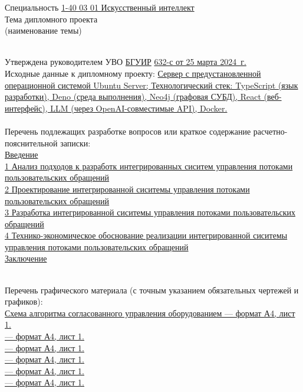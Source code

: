 {\begin{center}
  Специальность \uline{1-40 03 01 Искусственный интеллект}\lineunderscore\\[0.5em]

  Тема дипломного проекта \uline{\topicName}\lineunderscore \\
  {\footnotesize\hspace{15em}(наименование темы)}\\[-0.5em]
  \lineunderscore\\[0.5em]
  \end{center}

  Утверждена руководителем УВО \uline{БГУИР} \textnumero  \uline{632-с от 25 марта 2024~г.}\lineunderscore\\[-0.5em]
  
  Исходные данные к дипломному проекту: \uline{Сервер с предустановленной операционной системой Ubuntu Server; Технологический стек: TypeScript (язык разработки), Deno (среда выполнения), Neo4j (графовая СУБД), React (веб-интерфейс), LLM (через OpenAI-совместимые API), Docker. }\lineunderscore\\[0.5em]
  \lineunderscore\\
  
  Перечень подлежащих разработке вопросов или краткое содержание расчетно-пояснительной записки: 
  \lineunderscore\\
  \uline{Введение}\lineunderscore\\
  \uline{1 Анализ подходов к разработк интегрированных сиситем управления потоками пользовательских обращений}\lineunderscore\\
  \uline{2 Проектирование интегрированной сиситемы управления потоками пользовательских обращений}\lineunderscore\\
  \uline{3 Разработка интегрированной сиситемы управления потоками пользовательских обращений}\lineunderscore\\
  \uline{4 Технико-экономическое обоснование реализации интегрированной сиситемы управления потоками пользовательских обращений}\lineunderscore\\
  \uline{Заключение}\lineunderscore\\
  \lineunderscore\\
  \clearpage
  \thispagestyle{empty}

  Перечень графического материала (с точным указанием обязательных чертежей и графиков):
  \lineunderscore\\
  \uline{Схема алгоритма согласованного управления оборудованием --- формат А4, лист 1. }\lineunderscore\\
  \uline{ --- формат А4, лист 1. }\lineunderscore\\
  \uline{ --- формат А4, лист 1. }\lineunderscore\\
  \uline{ --- формат А4, лист 1. }\lineunderscore\\
  \uline{ --- формат А4, лист 1. }\lineunderscore\\
  \uline{ --- формат А4, лист 1. }\lineunderscore\\
  \lineunderscore\\

}
